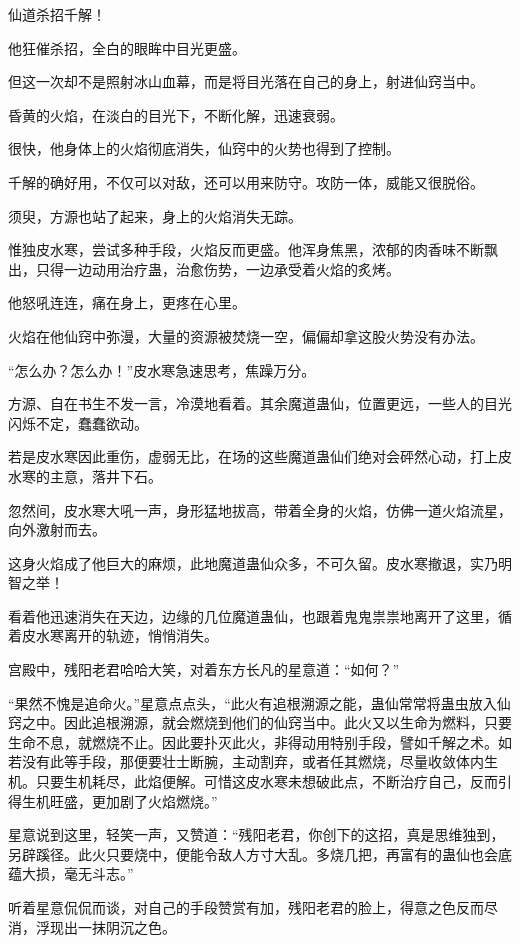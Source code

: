 \begin{this_body}
仙道杀招千解！

他狂催杀招，全白的眼眸中目光更盛。

但这一次却不是照射冰山血幕，而是将目光落在自己的身上，射进仙窍当中。

昏黄的火焰，在淡白的目光下，不断化解，迅速衰弱。

很快，他身体上的火焰彻底消失，仙窍中的火势也得到了控制。

千解的确好用，不仅可以对敌，还可以用来防守。攻防一体，威能又很脱俗。

须臾，方源也站了起来，身上的火焰消失无踪。

惟独皮水寒，尝试多种手段，火焰反而更盛。他浑身焦黑，浓郁的肉香味不断飘出，只得一边动用治疗蛊，治愈伤势，一边承受着火焰的炙烤。

他怒吼连连，痛在身上，更疼在心里。

火焰在他仙窍中弥漫，大量的资源被焚烧一空，偏偏却拿这股火势没有办法。

“怎么办？怎么办！”皮水寒急速思考，焦躁万分。

方源、自在书生不发一言，冷漠地看着。其余魔道蛊仙，位置更远，一些人的目光闪烁不定，蠢蠢欲动。

若是皮水寒因此重伤，虚弱无比，在场的这些魔道蛊仙们绝对会砰然心动，打上皮水寒的主意，落井下石。

忽然间，皮水寒大吼一声，身形猛地拔高，带着全身的火焰，仿佛一道火焰流星，向外激射而去。

这身火焰成了他巨大的麻烦，此地魔道蛊仙众多，不可久留。皮水寒撤退，实乃明智之举！

看着他迅速消失在天边，边缘的几位魔道蛊仙，也跟着鬼鬼祟祟地离开了这里，循着皮水寒离开的轨迹，悄悄消失。

宫殿中，残阳老君哈哈大笑，对着东方长凡的星意道：“如何？”

“果然不愧是追命火。”星意点点头，“此火有追根溯源之能，蛊仙常常将蛊虫放入仙窍之中。因此追根溯源，就会燃烧到他们的仙窍当中。此火又以生命为燃料，只要生命不息，就燃烧不止。因此要扑灭此火，非得动用特别手段，譬如千解之术。如若没有此等手段，那便要壮士断腕，主动割弃，或者任其燃烧，尽量收敛体内生机。只要生机耗尽，此焰便解。可惜这皮水寒未想破此点，不断治疗自己，反而引得生机旺盛，更加剧了火焰燃烧。”

星意说到这里，轻笑一声，又赞道：“残阳老君，你创下的这招，真是思维独到，另辟蹊径。此火只要烧中，便能令敌人方寸大乱。多烧几把，再富有的蛊仙也会底蕴大损，毫无斗志。”

听着星意侃侃而谈，对自己的手段赞赏有加，残阳老君的脸上，得意之色反而尽消，浮现出一抹阴沉之色。


\end{this_body}
